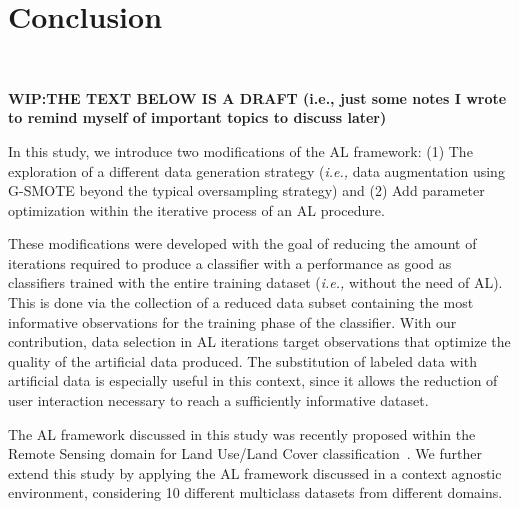 \documentclass[parskip=full]{scrartcl}
\begin{document}
\section{Conclusion}~\label{sec:conclusion}

\textbf{WIP:\@ THE TEXT BELOW IS A DRAFT (i.e., just some notes I wrote to
remind myself of important topics to discuss later)}

In this study, we introduce two modifications of the AL framework: (1) The
exploration of a different data generation strategy (\textit{i.e.,} data
augmentation using G-SMOTE beyond the typical oversampling strategy) and (2)
Add parameter optimization within the iterative process of an AL procedure.

These modifications were developed with the goal of reducing the amount of
iterations required to produce a classifier with a performance as good as
classifiers trained with the entire training dataset (\textit{i.e.,} without
the need of AL). This is done via the collection of a reduced data subset
containing the most informative observations for the training phase of the
classifier. With our contribution, data selection in AL iterations target
observations that optimize the quality of the artificial data produced. The
substitution of labeled data with artificial data is especially useful in this
context, since it allows the reduction of user interaction necessary to reach
a sufficiently informative dataset.

The AL framework discussed in this study was recently proposed within the Remote
Sensing domain for Land Use/Land Cover classification~\cite{Fonseca2021}. We
further extend this study by applying the AL framework discussed in a context
agnostic environment, considering 10 different multiclass datasets from
different domains.



\end{document}
